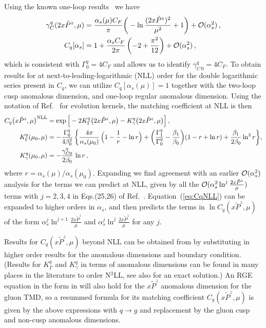 \documentclass[11pt,a4paper]{article}
\newcommand{\nn}{\nonumber}
\begin{document}
Using the known one-loop results~\cite{Ebert:2018gzl,Ji:2014hxa} we have
\begin{align}  \label{eq:gammaC}
\gamma_C^q(2x \tilde P^z, \mu) 
  & =  \frac{\alpha_s(\mu) C_F}{\pi} 
  \bigg(-\ln {(2x\tilde P^z)^2 \over \mu^2} +1  \bigg) 
  + {\cal O}(\alpha_s^2)\,,
 \\
C_q[\alpha_s] 
  &= 1 + \frac{\alpha_s C_F}{2\pi} \left(-2+{\pi^2\over 12}\right)  
  + {\cal O}(\alpha_s^2)
  \,, \nn
\end{align}
which is consistent with $\Gamma_0^q = 4 C_F$ and allows us to identify $\gamma_{C\,0}^q=4 C_F$.
To obtain results for  at next-to-leading-logarithmic (NLL) order for the double logarithmic series present in $C_q$, we can utilize $C_q[\alpha_s(\mu)]=1$ together with the two-loop cusp anomalous dimension, and one-loop regular anomalous dimension.
Using the notation of Ref.~\cite{Stewart:2010qs} for evolution kernels, the matching coefficient at NLL is then
\begin{align} \label{eq:CqNLL}
 C_q\big(x \tilde P^z, \mu\big)^{\rm NLL}
	&= \exp\Big[ -2 K_\Gamma^q \big(2x\tilde P^z,\mu \big) 
    - K_\gamma^q\big(2x\tilde P^z,\mu\big)  \Big] \,,
  \\
K_\Gamma^q(\mu_0, \mu) &= -\frac{\Gamma_0^{q}}{4\beta_0^2}\,
  \biggl\{ \frac{4\pi}{\alpha_s(\mu_0)}\, \Bigl(1 - \frac{1}{r} - \ln r\Bigr)
   + \biggl(\frac{\Gamma_1^{q}}{\Gamma_0^{q}} - \frac{\beta_1}{\beta_0}\biggr) (1-r+\ln r)  + \frac{\beta_1}{2\beta_0} \ln^2 r
    \biggr\}
  , \nn\\
K_\gamma^q(\mu_0, \mu) &=
 - \frac{\gamma_{C0}^{q}}{2\beta_0}\,  \ln r
 \,, \nn
\end{align}
where $r = \alpha_s(\mu)/\alpha_s(\mu_0)$. 
Expanding we find agreement with an earlier ${\cal O}(\alpha_s^2)$ analysis for the terms we can predict at NLL, given by all the ${\cal O}(\alpha_s^2 \ln^{j}\frac{2x\tilde P^z}{\mu})$ terms with $j=2,3,4$ in Eqs.(25,26) of Ref.~\cite{Ji:2019ewn}. Equation~(\ref{eq:CqNLL}) can be expanded to higher orders in $\alpha_s$, and then predicts the terms in $\ln C_q(x\tilde P^z,\mu)$ of the form $\alpha_s^j \ln^{j+1}\frac{2x\tilde P^z}{\mu}$ and $\alpha_s^j \ln^j\frac{2x\tilde P^z}{\mu}$ for any $j$. 

Results for $C_q(x\tilde P^z,\mu)$ beyond NLL can be obtained from  by substituting in higher order results for the anomalous dimensions and boundary condition. (Results for $K_\Gamma^q$ and $K_\gamma^q$ in terms of anomalous dimensions can be found in many places in the literature to order N$^3$LL, see also  for an exact solution.)
An RGE equation in the form in  will also hold for the $x\tilde P^z$ anomalous dimension for the gluon TMD, so a resummed formula for its matching coefficient $C_g(x\tilde P^z,\mu)$ is given by the above expressions with $q\to g$ and replacement by the gluon cusp and non-cusp anomalous dimensions. 
\end{document}
